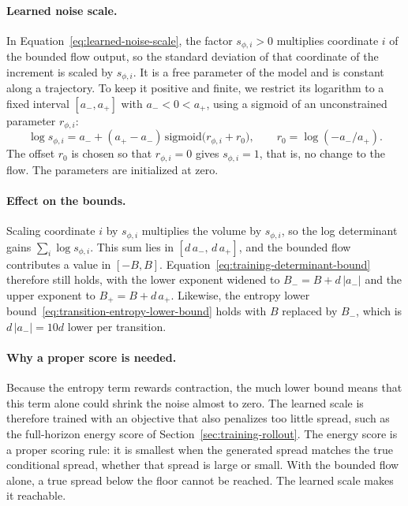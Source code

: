 \paragraph{Learned noise scale.}
In Equation~\eqref{eq:learned-noise-scale}, the factor $s_{\phi,i}>0$ multiplies coordinate $i$ of the bounded flow output, so the standard deviation of that coordinate of the increment is scaled by $s_{\phi,i}$. It is a free parameter of the model and is constant along a trajectory. To keep it positive and finite, we restrict its logarithm to a fixed interval $[a_-,a_+]$ with $a_-<0<a_+$, using a sigmoid of an unconstrained parameter $r_{\phi,i}$:
\begin{equation}\label{eq:learned-scale-parameterization}
 \log s_{\phi,i}=a_-+(a_+-a_-)\,\mathrm{sigmoid}\bigl(r_{\phi,i}+r_0\bigr),
 \qquad r_0=\log(-a_-/a_+).
\end{equation}
The offset $r_0$ is chosen so that $r_{\phi,i}=0$ gives $s_{\phi,i}=1$, that is, no change to the flow. The parameters are initialized at zero. 

\paragraph{Effect on the bounds.}
Scaling coordinate $i$ by $s_{\phi,i}$ multiplies the volume by $s_{\phi,i}$, so the log determinant gains $\sum_i\log s_{\phi,i}$. This sum lies in $[d\,a_-,\,d\,a_+]$, and the bounded flow contributes a value in $[-B,B]$. Equation~\eqref{eq:training-determinant-bound} therefore still holds, with the lower exponent widened to $B_-=B+d\,|a_-|$ and the upper exponent to $B_+=B+d\,a_+$. Likewise, the entropy lower bound~\eqref{eq:transition-entropy-lower-bound} holds with $B$ replaced by $B_-$, which is $d\,|a_-|=10d$ lower per transition.

\paragraph{Why a proper score is needed.}
Because the entropy term rewards contraction, the much lower bound means that this term alone could shrink the noise almost to zero. The learned scale is therefore trained with an objective that also penalizes too little spread, such as the full-horizon energy score of Section~\ref{sec:training-rollout}. The energy score is a proper scoring rule: it is smallest when the generated spread matches the true conditional spread, whether that spread is large or small. With the bounded flow alone, a true spread below the floor cannot be reached. The learned scale makes it reachable.

